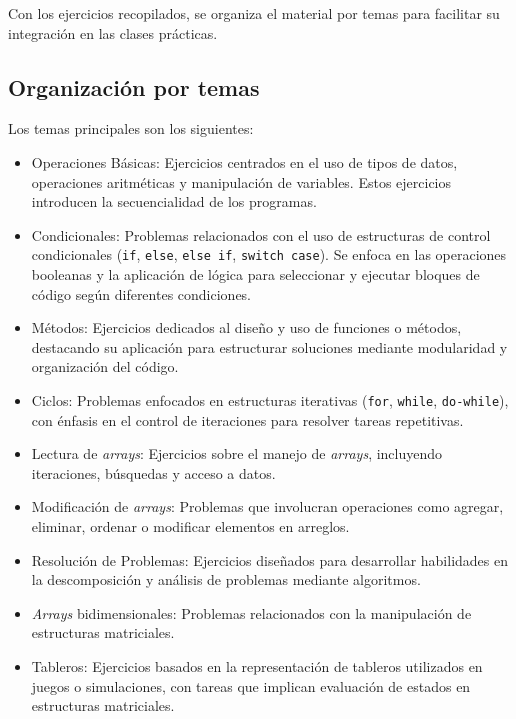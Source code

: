 \documentclass{article}
\begin{document}
Con los ejercicios recopilados, se organiza el material por temas para facilitar su integración en las clases prácticas.

\subsection{Organización por temas}\label{sec:organizacion_temas}
Los temas principales son los siguientes: 

\begin{itemize}  
    \item Operaciones Básicas:  
    Ejercicios centrados en el uso de tipos de datos, operaciones aritméticas y manipulación de variables. Estos ejercicios introducen la secuencialidad de los programas.  

    \item Condicionales:  
    Problemas relacionados con el uso de estructuras de control condicionales (\texttt{if}, \texttt{else}, \texttt{else if}, \texttt{switch case}). Se enfoca en las operaciones booleanas y la aplicación de lógica para seleccionar y ejecutar bloques de código según diferentes condiciones.

    \item Métodos:
    Ejercicios dedicados al diseño y uso de funciones o métodos, destacando su aplicación para estructurar soluciones mediante modularidad y organización del código.  

    \item Ciclos:  
    Problemas enfocados en estructuras iterativas (\texttt{for}, \texttt{while}, \texttt{do-while}), con énfasis en el control de iteraciones para resolver tareas repetitivas.

    \item Lectura de \textit{arrays}:  
    Ejercicios sobre el manejo de \textit{arrays}, incluyendo iteraciones, búsquedas y acceso a datos.  

    \item Modificación de \textit{arrays}:  
    Problemas que involucran operaciones como agregar, eliminar, ordenar o modificar elementos en arreglos.  

    \item Resolución de Problemas:  
    Ejercicios diseñados para desarrollar habilidades en la descomposición y análisis de problemas mediante algoritmos.

    \item \textit{Arrays} bidimensionales:  
    Problemas relacionados con la manipulación de estructuras matriciales.  

    \item Tableros:  
    Ejercicios basados en la representación de tableros utilizados en juegos o simulaciones, con tareas que implican evaluación de estados en estructuras matriciales.
\end{itemize}  
\end{document}
